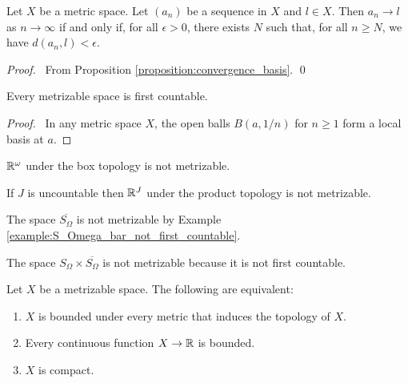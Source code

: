 \begin{proposition}
    \label{proposition:convergence_metric}
    Let $X$ be a metric space. Let $(a_n)$ be a sequence in $X$ and $l \in X$.
    Then $a_n \rightarrow l$ as $n \rightarrow \infty$ if and only if,
    for all $\epsilon > 0$, there exists $N$ such that, for all $n \geq N$,
    we have $d(a_n, l) < \epsilon$.
\end{proposition}

\begin{proof}
    \pf\ From Proposition \ref{proposition:convergence_basis}. \qed
\end{proof}

\begin{proposition}
    Every metrizable space is first countable.
\end{proposition}

\begin{proof}
    \pf\ In any metric space $X$, the open balls $B(a,1/n)$ for $n \geq 1$ form a local basis at $a$.
\end{proof}

\begin{example}
    $\mathbb{R}^\omega$ under the box topology is not metrizable.
\end{example}

\begin{example}
    If $J$ is uncountable then $\mathbb{R}^J$ under the product topology is not metrizable.
\end{example}

\begin{example}
    The space $\overline{S_\Omega}$ is not metrizable by Example \ref{example:S_Omega_bar_not_first_countable}.
\end{example}

\begin{example}
    The space $S_\Omega \times \overline{S_\Omega}$ is not metrizable because it is not first countable.
\end{example}

\begin{proposition}[Choice]
    Let $X$ be a metrizable space. The following are equivalent:
    \begin{enumerate}
        \item $X$ is bounded under every metric that induces the topology of $X$.
        \item Every continuous function $X \rightarrow \mathbb{R}$ is bounded.
        \item $X$ is compact.
    \end{enumerate}
\end{proposition}

